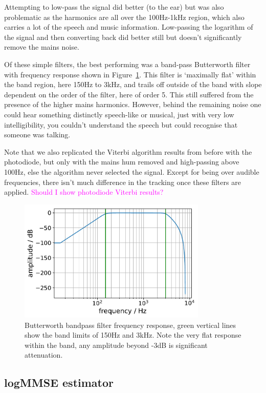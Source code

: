 \documentclass[prb,preprint]{revtex4-1}
\newcommand{\jam}{\textcolor{magenta}}
\begin{document}
Attempting to low-pass the signal did better (to the ear) but was also problematic as the harmonics are all over the 100Hz-1kHz region, which also carries a lot of the speech and music information. Low-passing the logarithm of the signal and then converting back did better still but doesn’t significantly remove the mains noise.


Of these simple filters, the best performing was a band-pass Butterworth filter with frequency response shown in Figure~\ref{fig:butterworth}. This filter is `maximally flat' within the band region, here 150Hz to 3kHz, and trails off outside of the band with slope dependent on the order of the filter, here of order 5. This still suffered from the presence of the higher mains harmonics. However, behind the remaining noise one could hear something distinctly speech-like or musical, just with very low intelligibility, you couldn’t understand the speech but could recognise that someone was talking.


Note that we also replicated the Viterbi algorithm results from before with the photodiode, but only with the mains hum removed and high-passing above 100Hz, else the algorithm never selected the signal. Except for being over audible frequencies, there isn’t much difference in the tracking once these filters are applied. \jam{Should I show photodiode Viterbi results?}

\begin{figure}%
	\includegraphics[width=0.8\textwidth]{figures/butterworth_150_3000-cropped.pdf}
	\caption{Butterworth bandpass filter frequency response, green vertical lines show the band limits of 150Hz and 3kHz. Note the very flat response within the band, any amplitude beyond -3dB is significant attenuation.}
	\label{fig:butterworth}
\end{figure}

\subsection{logMMSE estimator}
\end{document}
